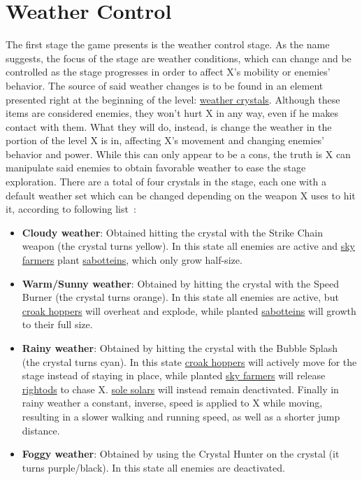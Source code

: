 \section{Weather Control}
The first stage the game presents is the weather control stage. As the name suggests, the focus of the stage are weather conditions, which can change and be controlled as the stage progresses in order to affect X's mobility or enemies' behavior. The source of said weather changes is to be found in an element presented right at the beginning of the level: \hyperlink{enem:Weather_crystal}{weather crystals}. Although these items are considered enemies, they won't hurt X in any way, even if he makes contact with them. What they will do, instead, is change the weather in the portion of the level X is in, affecting X's movement and changing enemies' behavior and power. While this can only appear to be a cons, the truth is X can manipulate said enemies to obtain favorable weather to ease the stage exploration. There are a total of four crystals in the stage, each one with a default weather set which can be changed depending on the weapon X uses to hit it, according to following list~\cite{wiki:Weather_crystal}:
\begin{itemize}
	\item \textbf{Cloudy weather}: Obtained hitting the crystal with the Strike Chain weapon (the crystal turns yellow). In this state all enemies are active and \hyperlink{enem:Sky_farmer}{sky farmers} plant \hyperlink{enem:Sabottein}{sabotteins}, which only grow half-size.
	\item \textbf{Warm/Sunny weather}: Obtained by hitting the crystal with the Speed Burner (the crystal turns orange). In this state all enemies are active, but \hyperlink{enem:Croak_hopper}{croak hoppers} will overheat and explode, while planted \hyperlink{enem:Sabottein}{sabotteins} will growth to their full size.
	\item \textbf{Rainy weather}: Obtained by hitting the crystal with the Bubble Splash (the crystal turns cyan). In this state \hyperlink{enem:Croak_hopper}{croak hoppers} will actively move for the stage instead of staying in place, while planted \hyperlink{enem:Sky_farmer}{sky farmers} will release \hyperlink{enem:Rightod}{rightods} to chase X. \hyperlink{enem:Sole_solar}{sole solars} will instead remain deactivated. Finally in rainy weather a constant, inverse, speed is applied to X while moving, resulting in a slower walking and running speed, as well as a shorter jump distance.
	\item \textbf{Foggy weather}: Obtained by using the Crystal Hunter on the crystal (it turns purple/black). In this state all enemies are deactivated.
\end{itemize}

